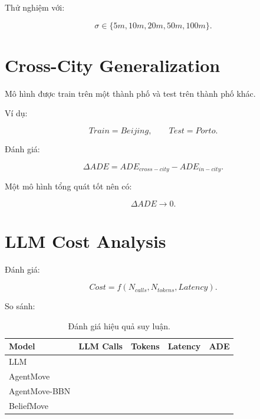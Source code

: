 \documentclass[11pt,a4paper]{article}
\begin{document}
	Thử nghiệm với:
	
	\begin{equation}
		\sigma
		\in
		\{
		5m,
		10m,
		20m,
		50m,
		100m
		\}.
	\end{equation}
	
	\section{Cross-City Generalization}
	
	Mô hình được train trên một thành phố và test trên thành phố khác.
	
	Ví dụ:
	
	\begin{equation}
		Train=Beijing,
		\qquad
		Test=Porto.
	\end{equation}
	
	Đánh giá:
	
	\begin{equation}
		\Delta ADE
		=
		ADE_{cross-city}
		-
		ADE_{in-city}.
	\end{equation}
	
	Một mô hình tổng quát tốt nên có:
	
	\begin{equation}
		\Delta ADE
		\rightarrow
		0.
	\end{equation}
	
	\section{LLM Cost Analysis}
	
	Đánh giá:
	
	\begin{equation}
		Cost
		=
		f(
		N_{calls},
		N_{tokens},
		Latency
		).
	\end{equation}
	
	So sánh:
	
	\begin{table}[H]
		\centering
		\caption{Đánh giá hiệu quả suy luận.}
		\label{tab:efficiency}
		
		\begin{tabular}{lcccc}
			\toprule
			Model & LLM Calls & Tokens & Latency & ADE \\
			\midrule
			LLM & & & & \\
			AgentMove & & & & \\
			AgentMove-BBN & & & & \\
			BeliefMove & & & & \\
			\bottomrule
		\end{tabular}
		
	\end{table}
	
\end{document}
